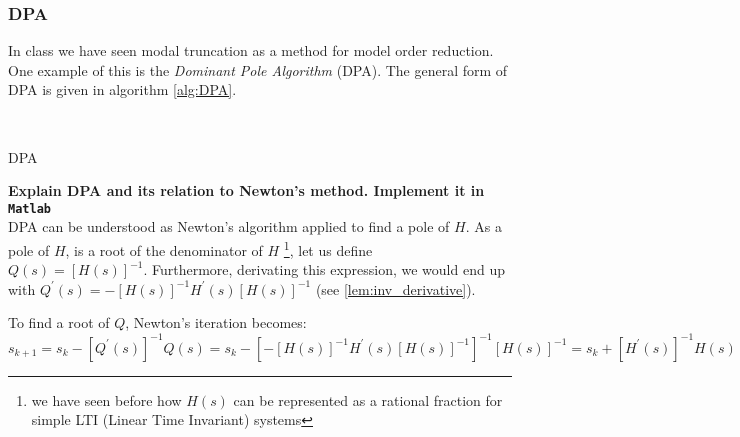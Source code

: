 \documentclass{article}
\begin{document}
	\subsubsection*{DPA}
	In class we have seen modal truncation as a method for model order reduction. One example of this is the \emph{Dominant Pole Algorithm} (DPA). The general form of DPA is given in algorithm \ref{alg:DPA}.
	\begin{algorithm2e}[ht]
		\SetAlgoLined
		\\
		\caption{DPA}
		\label{alg:DPA}
	\end{algorithm2e}
	
	\textbf{Explain DPA and its relation to Newton's method. Implement it in \texttt{Matlab}}\\
	
	DPA can be understood as Newton's algorithm applied to find a pole of $H$. As a pole of $H$, is a root of the denominator of $H$ \footnote{we have seen before how $H(s)$ can be represented as a rational fraction for simple LTI (Linear Time Invariant) systems}, let us define $Q(s) = \left[H(s)\right]^{-1}$. Furthermore, derivating this expression, we would end up with $Q^\prime(s) = -\left[H(s)\right]^{-1} H^\prime(s) \left[H(s)\right]^{-1}$ (see \autoref{lem:inv_derivative}).
	
	To find a root of $Q$, Newton's iteration becomes:
	\begin{equation}\label{eq:newton-it-Q2H}
		s_{k+1} = s_{k} - \left[Q^\prime(s)\right]^{-1} Q(s) = s_{k} - \left[-\left[H(s)\right]^{-1} H^\prime(s) \left[H(s)\right]^{-1}\right]^{-1} \left[H(s)\right]^{-1} = s_{k} + \left[H^\prime(s)\right]^{-1} H(s)
	\end{equation} 
	
\end{document}
